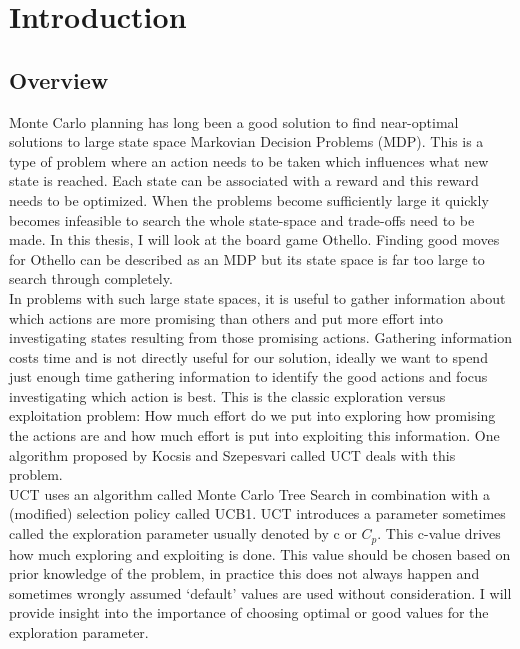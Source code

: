\documentclass[
11pt, %
english, %
singlespacing, %
headsepline, %
]{MastersDoctoralThesis} %
\begin{document}
\tableofcontents %



\mainmatter %

\pagestyle{thesis} %

\chapter{Introduction}

\section{Overview}
Monte Carlo planning has long been a good solution to find near-optimal solutions to large state space Markovian Decision Problems (MDP). This is a type of problem where an action needs to be taken which influences what new state is reached. Each state can be associated with a reward and this reward needs to be optimized. When the problems become sufficiently large it quickly becomes infeasible to search the whole state-space and trade-offs need to be made. In this thesis, I will look at the board game Othello. Finding good moves for Othello can be described as an MDP but its state space is far too large to search through completely.\\

In problems with such large state spaces, it is useful to gather information about which actions are more promising than others and put more effort into investigating states resulting from those promising actions. Gathering information costs time and is not directly useful for our solution, ideally we want to spend just enough time gathering information to identify the good actions and focus investigating which action is best. This is the classic exploration versus exploitation problem: How much effort do we put into exploring how promising the actions are and how much effort is put into exploiting this information. One algorithm proposed by Kocsis and Szepesvari\cite{Kocsis:2006} called UCT deals with this problem.\\

UCT uses an algorithm called Monte Carlo Tree Search in combination with a (modified) selection policy called UCB1. UCT introduces a parameter sometimes called the exploration parameter usually denoted by c or $C_p$. This c-value drives how much exploring and exploiting is done. This value should be chosen based on prior knowledge of the problem, in practice this does not always happen and sometimes wrongly assumed `default' values are used without consideration. I will provide insight into the importance of choosing optimal or good values for the exploration parameter.
\vfill
\pagebreak
\end{document}
